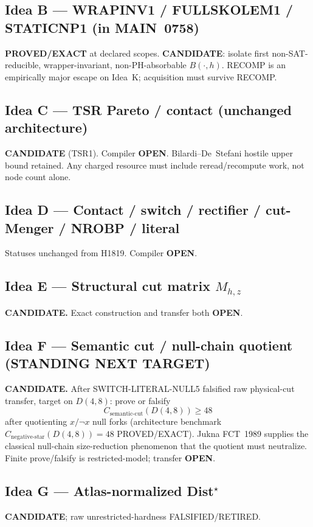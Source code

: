 \documentclass[11pt]{article}
\begin{document}
\subsection*{Idea B --- WRAPINV1 / FULLSKOLEM1 / STATICNP1 (in MAIN~0758)}
\textbf{PROVED/EXACT} at declared scopes.
\textbf{CANDIDATE}: isolate first non-SAT-reducible, wrapper-invariant, non-PH-absorbable $B(\cdot,h)$.
RECOMP is an empirically major escape on Idea~K; acquisition must survive RECOMP.

\subsection*{Idea C --- TSR Pareto / contact (unchanged architecture)}
\textbf{CANDIDATE} (TSR1). Compiler \textbf{OPEN}. Bilardi--De~Stefani hostile upper bound retained.
Any charged resource must include reread/recompute work, not node count alone.

\subsection*{Idea D --- Contact / switch / rectifier / cut-Menger / NROBP / literal}
Statuses unchanged from H1819. Compiler \textbf{OPEN}.

\subsection*{Idea E --- Structural cut matrix $M_{h,z}$}
\textbf{CANDIDATE.} Exact construction and transfer both \textbf{OPEN}.

\subsection*{Idea F --- Semantic cut / null-chain quotient (STANDING NEXT TARGET)}
\textbf{CANDIDATE.} After SWITCH-LITERAL-NULL5 falsified raw physical-cut transfer,
target on $D(4,8)$: prove or falsify
\[
C_{\mathrm{semantic\textrm{-}cut}}(D(4,8))\ge 48
\]
after quotienting $x/\neg x$ null forks (architecture benchmark
$C_{\mathrm{negative\textrm{-}star}}(D(4,8))=48$ PROVED/EXACT).
Jukna FCT~1989 supplies the classical null-chain size-reduction phenomenon that the
quotient must neutralize. Finite prove/falsify is restricted-model; transfer \textbf{OPEN}.

\subsection*{Idea G --- Atlas-normalized Dist$^\star$}
\textbf{CANDIDATE}; raw unrestricted-hardness FALSIFIED/RETIRED.
\end{document}
